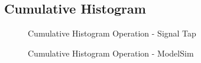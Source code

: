 \documentclass[12pt]{article}
\begin{document}
  \subsection{Cumulative Histogram}
    \begin{figure}[H]
    \caption{Cumulative Histogram Operation - Signal Tap}
    \label{fig:norm_histcum}
  \end{figure}
  
  \begin{figure}[H]
    \caption{Cumulative Histogram Operation - ModelSim}
    \label{fig:nomr_modhist}
  \end{figure}
  
  
\end{document}
